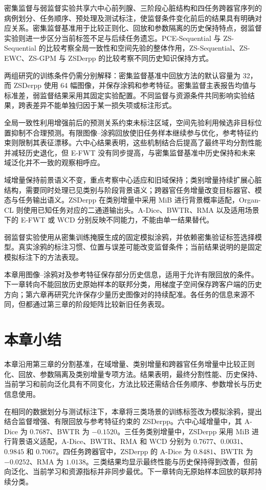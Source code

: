 密集监督与弱监督实验共享六中心前列腺、三阶段心脏结构和四任务跨器官序列的病例划分、任务顺序、预处理及测试标注，使监督条件变化前后的结果具有明确对应关系。密集监督基准用于比较正则化、回放和参数隔离的历史保持特点，弱监督实验则进一步区分当前标签不足与后续任务遗忘。PCE-Sequential 与 ZS-Sequential 的比较考察全局一致性和空间先验的整体作用，ZS-Sequential、ZS-EWC、ZS-GPM 与 ZSDerpp 的比较考察不同历史知识保持方式。

两组研究的训练条件仍需分别解释：密集监督基准中回放方法的默认容量为 32，而 ZSDerpp 使用 64 幅图像，并保存涂鸦和参考特征。密集监督主表报告均值与标准差，弱监督结果采用其固定实验配置。不同监督与资源条件共同影响实验结果，跨表差异不能单独归因于某一损失项或标注形式。

全局一致性利用增强前后的预测关系约束未标注区域，空间先验利用候选非目标位置抑制不合理预测\cite{zhang2026zscribbleseg}。有限图像--涂鸦回放使旧任务样本继续参与优化，参考特征约束则限制其表征漂移。六中心结果表明，这些机制结合后提高了最终平均分割性能并减轻历史退化，但 E-FWT 没有同步提高，与密集监督基准中历史保持和未来域泛化并不一致的观察相呼应。

域增量保持前景语义不变，重点考察中心适应和旧域保持；类别增量持续扩展心脏结构，需要同时处理已见类别与阶段背景语义；跨器官任务增量改变目标器官、模态与任务输出语义。ZSDerpp 在类别增量中采用 MiB 进行背景概率适配，Organ-CL 则使用已知任务对应的二通道输出头。A-Dice、BWTR、RMA 以及适用场景下的 E-FWT 或 WCD 分别反映不同能力，不能由单一结果替代。

弱监督实验使用从密集训练掩膜生成的固定模拟涂鸦，并依赖密集验证标签选择模型。真实涂鸦的标注习惯、位置与误差可能改变监督条件；当前结果说明的是固定模拟标注下的方法表现。

本章用图像--涂鸦对及参考特征保存部分历史信息，适用于允许有限回放的条件。下一章转向不能回放历史原始样本的联邦分类，用梯度子空间保存跨客户端的历史方向；第六章再研究允许保存少量历史图像对的持续配准。各任务的信息来源不同，但都通过第三章的阶段矩阵比较新旧任务表现。

\section{本章小结}
\label{sec:scribblecl-summary}

本章沿用第三章的分割基准，在域增量、类别增量和跨器官任务增量中比较正则化、回放、参数隔离及类别增量专项方法。结果表明，最终分割性能、历史保持、当前学习和前向泛化具有不同变化，方法比较还需结合任务顺序、参数增长与历史信息使用。

在相同的数据划分与测试标注下，本章将三类场景的训练标签改为模拟涂鸦，提出结合监督增强、有限回放与参考特征约束的 ZSDerpp。六中心域增量中，其 A-Dice 为 $0.7687$、BWTR 为 $-0.1520$。三任务类别增量中，ZSDerpp 采用 MiB 进行背景语义适配，A-Dice、BWTR、RMA 和 WCD 分别为 $0.7677$、$0.0031$、$0.9845$ 和 $0.7067$。四任务跨器官中，ZSDerpp 的 A-Dice 为 $0.8481$、BWTR 为 $-0.0252$、RMA 为 $1.0138$。三类结果均显示最终性能与历史保持得到改善，但前向泛化、当前学习和资源指标并非同步最优。下一章转向无原始样本回放的联邦持续分类。

